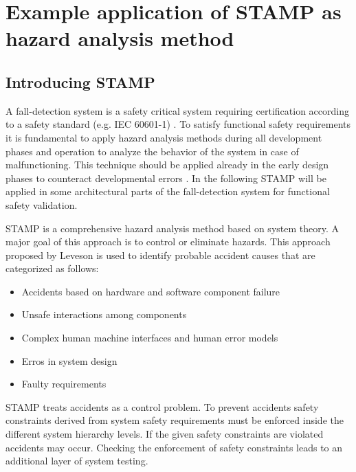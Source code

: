 \documentclass[review]{elsarticle}
\begin{document}
\section{Example application of STAMP as hazard analysis method}
\label{sec:STAMP}

\subsection{Introducing STAMP}
A fall-detection system is a safety critical system requiring certification according to a safety standard (e.g. IEC 60601-1) \cite{international2005medical}. To satisfy functional safety requirements it is fundamental to apply hazard analysis methods during all development phases and operation to analyze the behavior of the system in case of malfunctioning. This technique should be applied already in the early design phases to counteract developmental errors \cite{STAMPThesis}. In the following STAMP will be applied in some architectural parts of the fall-detection system for functional safety validation.

STAMP is a comprehensive hazard analysis method based on system theory. A major goal of this approach is to control or eliminate hazards. This approach proposed by Leveson \cite{leveson2011engineering} is used to identify probable accident causes that are categorized as follows:
\begin{itemize}
	\item Accidents based on hardware and software component failure
	\item Unsafe interactions among components
	\item Complex human machine interfaces and human error models
	\item Erros in system design
	\item Faulty requirements
\end{itemize}  
STAMP treats accidents as a control problem. To prevent accidents safety constraints derived from system safety requirements must be enforced inside the different system hierarchy levels. If the given safety constraints are violated accidents may occur. Checking the enforcement of safety constraints leads to an additional layer of system testing. 
\end{document}
